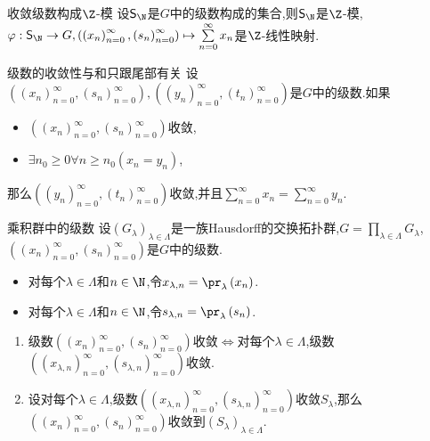 \begin{proposition}{收敛级数构成$\Z$-模}{}
	设$\mathsf{S}_{\N}$是$G$中的级数构成的集合,则$\mathsf{S}_{\N}$是$\Z$-模,$\varphi:\mathsf{S}_{\N}\to G,\left(\left(x_{n}\right)_{n=0}^{\infty},\left(s_{n}\right)_{n=0}^{\infty}\right)\mapsto\sum\limits_{n=0}^{\infty}x_{n}$是$\Z$-线性映射.
\end{proposition}

\begin{proposition}{级数的收敛性与和只跟尾部有关}{}
	设$\left(\left(x_{n}\right)_{n=0}^{\infty},\left(s_{n}\right)_{n=0}^{\infty}\right),\left(\left(y_{n}\right)_{n=0}^{\infty},\left(t_{n}\right)_{n=0}^{\infty}\right)$是$G$中的级数.如果
	\begin{itemize}
		\item $\left(\left(x_{n}\right)_{n=0}^{\infty},\left(s_{n}\right)_{n=0}^{\infty}\right)$收敛,
		\item $\exists n_{0}\geq 0\forall n\geq n_{0}\left(x_{n}=y_{n}\right)$,
	\end{itemize}
	那么$\left(\left(y_{n}\right)_{n=0}^{\infty},\left(t_{n}\right)_{n=0}^{\infty}\right)$收敛,并且$\sum\limits_{n=0}^{\infty}x_{n}=\sum\limits_{n=0}^{\infty}y_{n}$.
\end{proposition}

\begin{proposition}{乘积群中的级数}{}
	设$\left(G_{\lambda}\right)_{\lambda\in\Lambda}$是一族Hausdorff的交换拓扑群,$G=\prod\limits_{\lambda\in\Lambda}G_{\lambda}$,$\left(\left(x_{n}\right)_{n=0}^{\infty},\left(s_{n}\right)_{n=0}^{\infty}\right)$是$G$中的级数.
	\begin{itemize}
		\item 对每个$\lambda\in\Lambda$和$n\in\N$,令$x_{\lambda,n}=\pr_{\lambda}\left(x_{n}\right)$.
		\item 对每个$\lambda\in\Lambda$和$n\in\N$,令$s_{\lambda,n}=\pr_{\lambda}\left(s_{n}\right)$.
	\end{itemize}
	\begin{enumerate}
		\item 级数$\left(\left(x_{n}\right)_{n=0}^{\infty},\left(s_{n}\right)_{n=0}^{\infty}\right)$收敛$\iff$对每个$\lambda\in\Lambda$,级数$\left(\left(x_{\lambda,n}\right)_{n=0}^{\infty},\left(s_{\lambda,n}\right)_{n=0}^{\infty}\right)$收敛.
		\item 设对每个$\lambda\in\Lambda$,级数$\left(\left(x_{\lambda,n}\right)_{n=0}^{\infty},\left(s_{\lambda,n}\right)_{n=0}^{\infty}\right)$收敛$S_{\lambda}$,那么$\left(\left(x_{n}\right)_{n=0}^{\infty},\left(s_{n}\right)_{n=0}^{\infty}\right)$收敛到$\left(S_{\lambda}\right)_{\lambda\in\Lambda}$.
	\end{enumerate}
\end{proposition}

